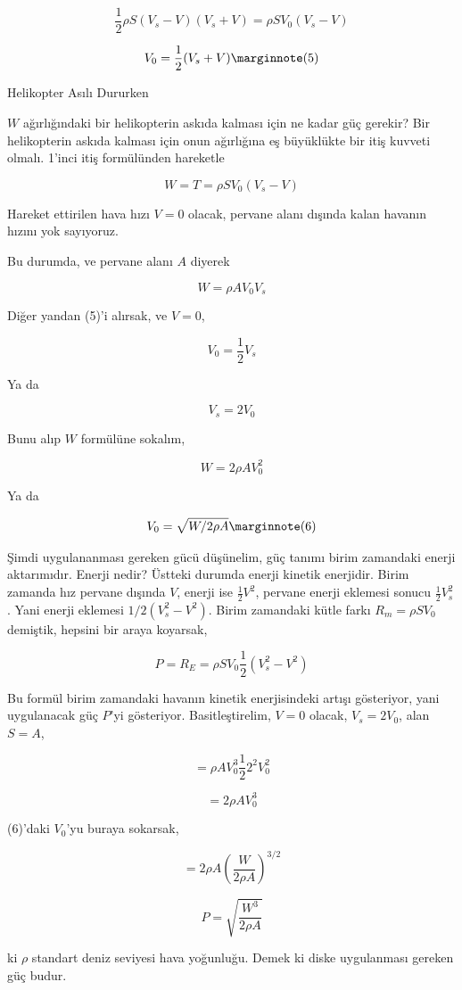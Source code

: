 \documentclass[12pt,fleqn]{article}\usepackage{../../common}
\begin{document}
$$
\frac{1}{2} \rho S (V_s - V)(V_s + V) = \rho S V_0 (V_s - V)
$$

$$
V_0 = \frac{1}{2} (V_s + V)  
\mlabel{5}
$$

Helikopter Asılı Dururken

$W$ ağırlığındaki bir helikopterin askıda kalması için ne kadar güç
gerekir? Bir helikopterin askıda kalması için onun ağırlığına eş büyüklükte
bir itiş kuvveti olmalı. 1'inci itiş formülünden hareketle

$$
W = T = \rho S V_0  (V_s - V)
$$

Hareket ettirilen hava hızı $V = 0$ olacak, pervane alanı dışında kalan
havanın hızını yok sayıyoruz.

Bu durumda, ve pervane alanı $A$ diyerek

$$
W = \rho A V_0 V_s
$$

Diğer yandan (5)'i alırsak, ve $V=0$,

$$
V_0 = \frac{1}{2} V_s
$$

Ya da

$$
V_s = 2 V_0
$$

Bunu alıp $W$ formülüne sokalım,

$$
W = 2 \rho A V_0^2
$$

Ya da

$$
V_0 = \sqrt{W / 2 \rho A} 
\mlabel{6}
$$

Şimdi uygulananması gereken gücü düşünelim, güç tanımı birim zamandaki
enerji aktarımıdır. Enerji nedir? Üstteki durumda enerji kinetik enerjidir.
Birim zamanda hız pervane dışında $V$, enerji ise $\frac{1}{2}V^2$, pervane
enerji eklemesi sonucu $\frac{1}{2} V_s^2$. Yani enerji eklemesi
$1/2(V_s^2 - V^2)$. Birim zamandaki kütle farkı $R_m = \rho S V_0$
demiştik, hepsini bir araya koyarsak,

$$
P = R_E = \rho S V_0 \frac{1}{2} (V_s^2 - V^2)
$$

Bu formül birim zamandaki havanın kinetik enerjisindeki artışı gösteriyor,
yani uygulanacak güç $P$'yi gösteriyor. Basitleştirelim, $V=0$ olacak,
$V_s = 2 V_0$, alan $S=A$,

$$
= \rho A V_0^3 \frac{1}{2} 2^2 V_0^2
$$

$$
= 2 \rho A V_0^3
$$

(6)'daki $V_0$'yu buraya sokarsak,

$$
= 2 \rho A \left( \frac{W}{ 2 \rho A} \right)^{3/2}
$$

$$
P = \sqrt{ \frac{W^3}{2 \rho A} }
$$

ki $\rho$ standart deniz seviyesi hava yoğunluğu. Demek ki diske
uygulanması gereken güç budur.
\end{document}
